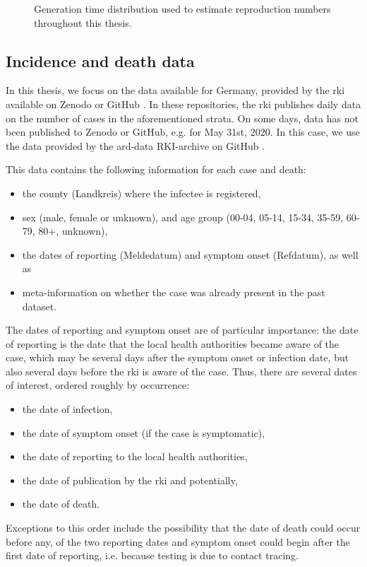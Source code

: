 \begin{figure}
    \resizebox{\textwidth}{!}{%
    }
    \caption{Generation time distribution used to estimate reproduction numbers throughout this thesis.}
    \label{fig:generation_time}
\end{figure}

\subsection{Incidence and death data}
\label{subsec:incidence_and_death_data}
In this thesis, we focus on the data available for Germany, provided by the \gls{rki} available on Zenodo \citep{RobertKoch-Institut2024SARSCoV2} or GitHub \citep{RobertKoch-Institut2024SARSCoV2a}. In these repositories, the \gls{rki} publishes daily data on the number of cases in the aforementioned strata. On some days, data has not been published to Zenodo or GitHub, e.g. for May 31st, 2020. In this case, we use the data provided by the ard-data RKI-archive on GitHub \citep{MichaelKreil2022RKICoronaDatenArchiv}. 

This data contains the following information for each case and death:
\begin{itemize}
    \item the county (Landkreis) where the infectee is registered,
    \item sex (male, female or unknown), and age group (00-04, 05-14, 15-34, 35-59, 60-79, 80+, unknown),
    \item the dates of reporting (Meldedatum) and symptom onset (Refdatum), as well as
    \item meta-information on whether the case was already present in the past dataset.
\end{itemize}

The dates of reporting and symptom onset are of particular importance: the date of reporting is the date that the local health authorities became aware of the case, which may be several days after the symptom onset or infection date, but also several days before the \gls{rki} is aware of the case. Thus, there are several dates of interest, ordered roughly by occurrence: 
\begin{itemize}
    \item the date of infection, 
    \item the date of symptom onset (if the case is symptomatic), 
    \item the date of reporting to the local health authorities,
    \item the date of publication by the \gls{rki} and potentially,
    \item the date of death.
\end{itemize}
Exceptions to this order include the possibility that the date of death could occur before any, of the two reporting dates and symptom onset could begin after the first date of reporting, i.e. because testing is due to contact tracing.

